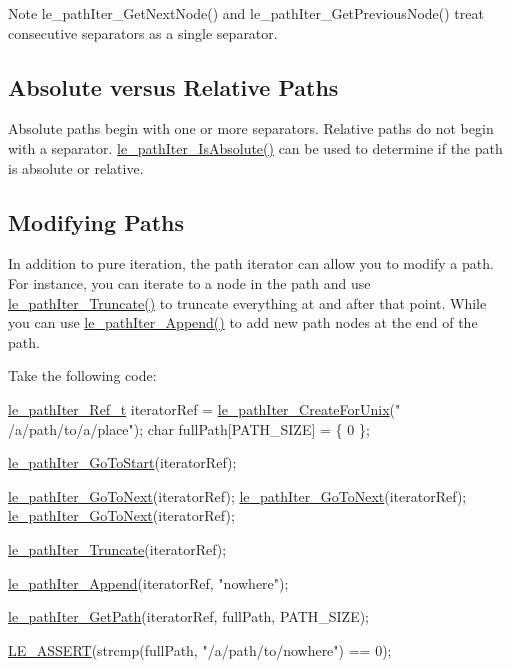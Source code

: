 \begin{DoxyNote}{Note}
{\ttfamily le\+\_\+path\+Iter\+\_\+\+Get\+Next\+Node()} and {\ttfamily le\+\_\+path\+Iter\+\_\+\+Get\+Previous\+Node()} treat consecutive separators as a single separator.
\end{DoxyNote}
\hypertarget{c_path_iter_c_pathIter_absoluteRelative}{}\subsection{Absolute versus Relative Paths}\label{c_path_iter_c_pathIter_absoluteRelative}
Absolute paths begin with one or more separators. Relative paths do not begin with a separator. {\ttfamily \hyperlink{le__path_iter_8h_a657f779873a2220f463f705298c1399f}{le\+\_\+path\+Iter\+\_\+\+Is\+Absolute()}} can be used to determine if the path is absolute or relative.\hypertarget{c_path_iter_c_pathIter_modifyPath}{}\subsection{Modifying Paths}\label{c_path_iter_c_pathIter_modifyPath}
In addition to pure iteration, the path iterator can allow you to modify a path. For instance, you can iterate to a node in the path and use {\ttfamily \hyperlink{le__path_iter_8h_a04be1341536a3e330a815171e7cdbf7a}{le\+\_\+path\+Iter\+\_\+\+Truncate()}} to truncate everything at and after that point. While you can use {\ttfamily \hyperlink{le__path_iter_8h_ae6aa59696c54d2523009037cc78f9725}{le\+\_\+path\+Iter\+\_\+\+Append()}} to add new path nodes at the end of the path.

Take the following code\+:


\begin{DoxyCode}
\hyperlink{le__path_iter_8h_a0facb15e56e7ef896384eca415a7147a}{le\_pathIter\_Ref\_t} iteratorRef = \hyperlink{le__path_iter_8h_a35a38b307f9fdc0de82552e96a5a2d1d}{le\_pathIter\_CreateForUnix}(\textcolor{stringliteral}{"
      /a/path/to/a/place"});
\textcolor{keywordtype}{char} fullPath[PATH\_SIZE] = \{ 0 \};

\hyperlink{le__path_iter_8h_af4352480ab3c9ffb09e740f2899d504e}{le\_pathIter\_GoToStart}(iteratorRef);

\hyperlink{le__path_iter_8h_ad83a619dcc34ecf03da1859b3da2f57f}{le\_pathIter\_GoToNext}(iteratorRef);
\hyperlink{le__path_iter_8h_ad83a619dcc34ecf03da1859b3da2f57f}{le\_pathIter\_GoToNext}(iteratorRef);
\hyperlink{le__path_iter_8h_ad83a619dcc34ecf03da1859b3da2f57f}{le\_pathIter\_GoToNext}(iteratorRef);

\hyperlink{le__path_iter_8h_a04be1341536a3e330a815171e7cdbf7a}{le\_pathIter\_Truncate}(iteratorRef);

\hyperlink{le__path_iter_8h_ae6aa59696c54d2523009037cc78f9725}{le\_pathIter\_Append}(iteratorRef, \textcolor{stringliteral}{"nowhere"});

\hyperlink{le__path_iter_8h_a4a1c39584a779518395b41f957765283}{le\_pathIter\_GetPath}(iteratorRef, fullPath, PATH\_SIZE);

\hyperlink{le__log_8h_ac0dbbef91dc0fed449d0092ff0557b39}{LE\_ASSERT}(strcmp(fullPath, \textcolor{stringliteral}{"/a/path/to/nowhere"}) == 0);
\end{DoxyCode}


